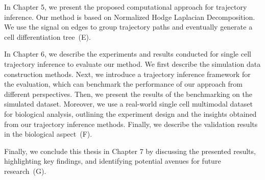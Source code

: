 In Chapter 5, we present the proposed computational approach for trajectory inference. Our method is based on Normalized Hodge Laplacian Decomposition. We use the signal on edges to group trajectory paths and eventually generate a cell differentiation tree~(E).

In Chapter 6, we describe the experiments and results conducted for single cell trajectory inference to evaluate our method. We first describe the simulation data construction methods. Next, we introduce a trajectory inference framework for the evaluation, which can benchmark the performance of our approach from different perspectives. Then, we present the results of the benchmarking on the simulated dataset. Moreover, we use a real-world single cell multimodal dataset for biological analysis, outlining the experiment design and the insights obtained from our trajectory inference methods. Finally, we describe the validation results in the biological aspect~(F).

Finally, we conclude this thesis in Chapter 7 by discussing the presented results, highlighting key findings, and identifying potential avenues for future research~(G).
